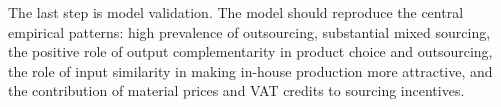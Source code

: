 \documentclass[11pt,a4paper]{article}
\begin{document}
The last step is model validation. The model should reproduce the central empirical patterns: high prevalence of outsourcing, substantial mixed sourcing, the positive role of output complementarity in product choice and outsourcing, the role of input similarity in making in-house production more attractive, and the contribution of material prices and VAT credits to sourcing incentives.
\end{document}

